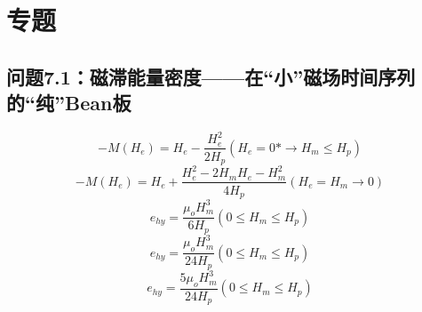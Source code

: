 \section{专题}
\subsection{问题7.1：磁滞能量密度——在“小”磁场时间序列的“纯”Bean板}

\begin{equation}%
-M(H_e)=H_e-\frac{H_{e}^{2}}{2H_p}        (H_e=0*\rightarrow H_m\leq H_p)
\end{equation}
\begin{equation}%
-M(H_e)=H_e+\frac{H_{e}^{2}-2H_mH_e-H_{m}^{2}}{4H_p}      (H_e=H_m\rightarrow 0)
\end{equation}
\begin{equation}%
e_{hy}=\frac{\mu_oH_{m}^{3}}{6H_p}        (0\leq H_m\leq H_p)
\end{equation}
\begin{equation}%
e_{hy}=\frac{\mu_oH_{m}^{3}}{24H_p}       (0\leq H_m\leq H_p)
\end{equation}
\begin{equation}%
e_{hy}=\frac{5\mu_oH_{m}^{3}}{24H_p}      (0\leq H_m\leq H_p)
\end{equation}

